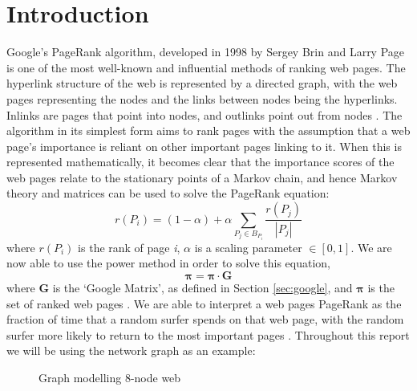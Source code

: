 \documentclass[11pt]{report}
\begin{document}
\chapter{Introduction}\label{chap:import}
Google's PageRank algorithm, developed in 1998 by Sergey Brin and Larry Page is one of the most well-known and influential methods of ranking web pages. The hyperlink structure of the web is represented by a directed graph, with the web pages representing the nodes and the links between nodes being the hyperlinks. Inlinks are pages that point into nodes, and outlinks point out from nodes \cite{brin1998anatomy}. The algorithm in its simplest form aims to rank pages with the assumption that a web page's importance is reliant on other important pages linking to it. When this is represented mathematically, it becomes clear that the importance scores of the web pages relate to the stationary points of a Markov chain, and hence Markov theory and matrices can be used to solve the PageRank equation:
\begin{equation} \label{eq:PR}
r(P_i) = (1-\alpha) + \alpha \displaystyle \sum_{P_j\in B_{P_i }} \frac{r(P_j)}{|P_j|}
\end{equation} where $r(P_i)$ is the rank of page \textit{i}, $\alpha$ is a scaling parameter $\in [0,1]$. We are now able to use the power method in order to solve this equation, 
\[\boldsymbol{\pi} = \boldsymbol{\pi} \cdot \textbf{G}\] 
where \textbf{G} is the `Google Matrix', as defined in Section \ref{sec:google}, and $\boldsymbol{\pi}$ is the set of ranked web pages \cite{langville}.
We are able to interpret a web pages PageRank as the fraction of time that a random surfer spends on that web page, with the random surfer more likely to return to the most important pages \cite{bonato}. Throughout this report we will be using the network graph as an example: 
\begin{figure}[H]
\centering
{}
\caption{Graph modelling 8-node web} \label{fig:Example}
\end{figure}
\end{document}

